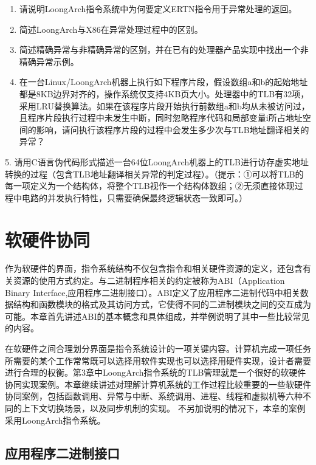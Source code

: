 \documentclass[]{ctexbook}
\providecommand{\tightlist}{%
  \setlength{\itemsep}{0pt}\setlength{\parskip}{0pt}}
\begin{document}
\begin{enumerate}
\def\labelenumi{\arabic{enumi}.}
\tightlist
\item
  请说明LoongArch指令系统中为何要定义ERTN指令用于异常处理的返回。
\item
  简述LoongArch与X86在异常处理过程中的区别。
\item
  简述精确异常与非精确异常的区别，并在已有的处理器产品实现中找出一个非精确异常示例。
\item
  在一台Linux/LoongArch机器上执行如下程序片段，假设数组a和b的起始地址都是8KB边界对齐的，操作系统仅支持4KB页大小。处理器中的TLB有32项，采用LRU替换算法。如果在该程序片段开始执行前数组a和b均从未被访问过，且程序片段执行过程中未发生中断，同时忽略程序代码和局部变量i所占地址空间的影响，请问执行该程序片段的过程中会发生多少次与TLB地址翻译相关的异常？
\end{enumerate}

5. 请用C语言伪代码形式描述一台64位LoongArch机器上的TLB进行访存虚实地址转换的过程（包含TLB地址翻译相关异常的判定过程）。（提示：①可以将TLB的每一项定义为一个结构体，将整个TLB视作一个结构体数组；②无须直接体现过程中电路的并发执行特性，只需要确保最终逻辑状态一致即可。）

\newpage

\hypertarget{ux8f6fux786cux4ef6ux534fux540c}{%
\chapter{软硬件协同}\label{ux8f6fux786cux4ef6ux534fux540c}}

作为软硬件的界面，指令系统结构不仅包含指令和相关硬件资源的定义，还包含有关资源的使用方式约定。与二进制程序相关的约定被称为ABI（Application Binary Interface,应用程序二进制接口）。ABI定义了应用程序二进制代码中相关数据结构和函数模块的格式及其访问方式，它使得不同的二进制模块之间的交互成为可能。本章首先讲述ABI的基本概念和具体组成，并举例说明了其中一些比较常见的内容。

在软硬件之间合理划分界面是指令系统设计的一项关键内容。计算机完成一项任务所需要的某个工作常常既可以选择用软件实现也可以选择用硬件实现，设计者需要进行合理的权衡。第3章中LoongArch指令系统的TLB管理就是一个很好的软硬件协同实现案例。本章继续讲述对理解计算机系统的工作过程比较重要的一些软硬件协同案例，包括函数调用、异常与中断、系统调用、进程、线程和虚拟机等六种不同的上下文切换场景，以及同步机制的实现。
不另加说明的情况下，本章的案例采用LoongArch指令系统。

\hypertarget{ux5e94ux7528ux7a0bux5e8fux4e8cux8fdbux5236ux63a5ux53e3}{%
\section{应用程序二进制接口}\label{ux5e94ux7528ux7a0bux5e8fux4e8cux8fdbux5236ux63a5ux53e3}}
\end{document}
